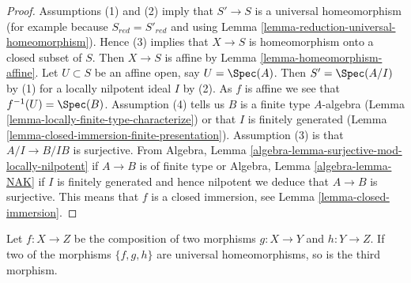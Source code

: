 \begin{proof}
Assumptions (1) and (2) imply that $S' \to S$ is a universal homeomorphism
(for example because $S_{red} = S'_{red}$ and using
Lemma \ref{lemma-reduction-universal-homeomorphism}).
Hence (3) implies that $X \to S$ is homeomorphism onto a
closed subset of $S$. Then $X \to S$ is affine by
Lemma \ref{lemma-homeomorphism-affine}.
Let $U \subset S$ be an affine open, say $U = \Spec(A)$. Then $S' = \Spec(A/I)$
by (1) for a locally nilpotent ideal $I$ by (2). As $f$ is affine we see that
$f^{-1}(U) = \Spec(B)$.
Assumption (4) tells us $B$ is a finite type $A$-algebra
(Lemma \ref{lemma-locally-finite-type-characterize}) or
that $I$ is finitely generated
(Lemma \ref{lemma-closed-immersion-finite-presentation}).
Assumption (3) is that $A/I \to B/IB$ is surjective. From
Algebra, Lemma \ref{algebra-lemma-surjective-mod-locally-nilpotent}
if $A \to B$ is of finite type
or Algebra, Lemma \ref{algebra-lemma-NAK} if $I$ is finitely generated
and hence nilpotent we deduce that $A \to B$ is surjective.
This means that $f$ is a closed immersion, see
Lemma \ref{lemma-closed-immersion}.
\end{proof}

\begin{lemma}
\label{lemma-permanence-universal-homeomorphism}
Let $f : X \to Z$ be the composition of two morphisms 
$g : X \to Y$ and $h : Y \to Z$.
If two of the morphisms $\{f, g, h\}$ are universal homeomorphisms,
so is the third morphism.
\end{lemma}

